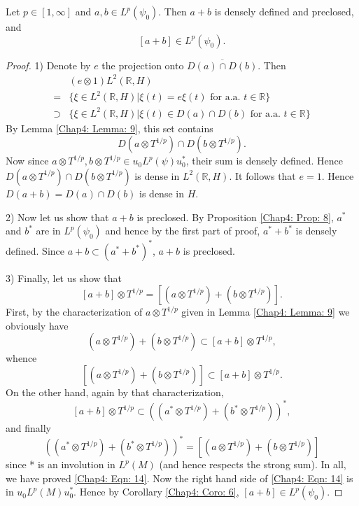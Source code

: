 \begin{lemma}
    Let $p\in [1,\infty]$ and $a,b\in L^p(\psi_0)$.
    Then $a+b$ is densely defined and preclosed, and
    \[
        [a+b]\in L^p(\psi_0).
    \]
\end{lemma}
\begin{proof}
    1) Denote by $e$ the projection onto $\overline{D(a)\cap D(b)}$. Then
    \[
        \begin{split}
            &(e\otimes 1)L^2(\mathbb{R},H)\\
            =&\{\xi\in L^2(\mathbb{R},H)|\xi(t)=e\xi(t) \text{ for a.a. } t\in \mathbb{R}\}\\
            \supset &\{\xi\in L^2(\mathbb{R},H)|\xi(t)\in D(a)\cap D(b)\text{ for a.a. } t\in \mathbb{R}\}
        \end{split}
    \]
    By Lemma \ref{Chap4: Lemma: 9}, this set contains
    \[
        D(a\otimes T^{1/p})\cap D(b\otimes T^{1/p}).
    \]
    Now since $a\otimes T^{1/p},b\otimes T^{1/p}\in u_0L^p(\psi)u_0^*$, their sum is densely defined. Hence $D(a\otimes T^{1/p})\cap D(b\otimes T^{1/p})$ is dense in $L^2(\mathbb{R},H)$. It follows that $e = 1$. Hence $D(a+b) = D(a)\cap D(b)$ is dense in $H$.\par
    2) Now let us show that $a+b$ is preclosed. By Proposition \ref{Chap4: Prop: 8}, $a^*$ and $b^*$ are in $L^p(\psi_0)$ and hence by the first part of proof, $a^*+ b^*$ is densely defined. Since $a+b \subset (a^*+b^*)^*$, $a+b$ is preclosed.\par
    3) Finally, let us show that
    \begin{equation}\label{Chap4: Eqn: 14}
        [a+b]\otimes T^{1/p}=[(a\otimes T^{1/p})+(b\otimes T^{1/p})].
    \end{equation}
    First, by the characterization of $a\otimes T^{1/p}$ given in Lemma \ref{Chap4: Lemma: 9} we obviously have
    \[
        (a\otimes T^{1/p})+(b\otimes T^{1/p})\subset [a+b]\otimes T^{1/p},
    \]
    whence
    \[
        [(a\otimes T^{1/p})+(b\otimes T^{1/p})]\subset [a+b]\otimes T^{1/p}.
    \]
    On the other hand, again by that characterization,
    \[
        [a+b]\otimes T^{1/p}\subset ((a^*\otimes T^{1/p})+(b^*\otimes T^{1/p}))^*,
    \]
    and finally
    \[
        ((a^*\otimes T^{1/p})+(b^*\otimes T^{1/p}))^*=[(a\otimes T^{1/p})+(b\otimes T^{1/p})]
    \]
    since * is an involution in $L^p(M)$ (and hence respects the strong sum). In all, we have proved \eqref{Chap4: Eqn: 14}. Now the right hand side of \eqref{Chap4: Eqn: 14} is in $u_0L^p(M)u_0^*$. Hence by Corollary \ref{Chap4: Coro: 6}, $[a+b]\in L^p(\psi_0)$.
\end{proof}

